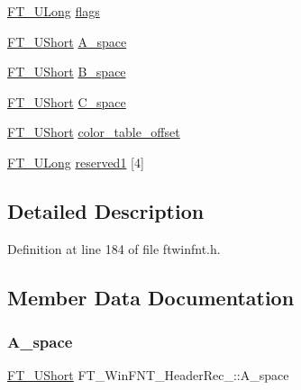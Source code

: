 \begin{DoxyCompactItemize}
\item 
\mbox{\hyperlink{fttypes_8h_a4fac88bdba78eb76b505efa6e4fbf3f5}{F\+T\+\_\+\+U\+Long}} \mbox{\hyperlink{struct_f_t___win_f_n_t___header_rec___ac3230b8c51250b5c1e48c8e38c44d6f6}{flags}}
\item 
\mbox{\hyperlink{fttypes_8h_a937f6c17cf5ffd09086d8610c37b9f58}{F\+T\+\_\+\+U\+Short}} \mbox{\hyperlink{struct_f_t___win_f_n_t___header_rec___ad97f5f84ac213c1fb59ceeafc689f381}{A\+\_\+space}}
\item 
\mbox{\hyperlink{fttypes_8h_a937f6c17cf5ffd09086d8610c37b9f58}{F\+T\+\_\+\+U\+Short}} \mbox{\hyperlink{struct_f_t___win_f_n_t___header_rec___aabd41a485124b6c4220fc4622525608e}{B\+\_\+space}}
\item 
\mbox{\hyperlink{fttypes_8h_a937f6c17cf5ffd09086d8610c37b9f58}{F\+T\+\_\+\+U\+Short}} \mbox{\hyperlink{struct_f_t___win_f_n_t___header_rec___a1173b4d5c809db01edf4ff2185e1d43b}{C\+\_\+space}}
\item 
\mbox{\hyperlink{fttypes_8h_a937f6c17cf5ffd09086d8610c37b9f58}{F\+T\+\_\+\+U\+Short}} \mbox{\hyperlink{struct_f_t___win_f_n_t___header_rec___a83fa51bfd7fe814f8264416204701c60}{color\+\_\+table\+\_\+offset}}
\item 
\mbox{\hyperlink{fttypes_8h_a4fac88bdba78eb76b505efa6e4fbf3f5}{F\+T\+\_\+\+U\+Long}} \mbox{\hyperlink{struct_f_t___win_f_n_t___header_rec___af01de9742608fb7a2a603d062f3783e3}{reserved1}} \mbox{[}4\mbox{]}
\end{DoxyCompactItemize}


\subsection{Detailed Description}


Definition at line 184 of file ftwinfnt.\+h.



\subsection{Member Data Documentation}
\mbox{\label{struct_f_t___win_f_n_t___header_rec___ad97f5f84ac213c1fb59ceeafc689f381}} 
\subsubsection{\texorpdfstring{A\_space}{A\_space}}
{\footnotesize\ttfamily \mbox{\hyperlink{fttypes_8h_a937f6c17cf5ffd09086d8610c37b9f58}{F\+T\+\_\+\+U\+Short}} F\+T\+\_\+\+Win\+F\+N\+T\+\_\+\+Header\+Rec\+\_\+\+::\+A\+\_\+space}



